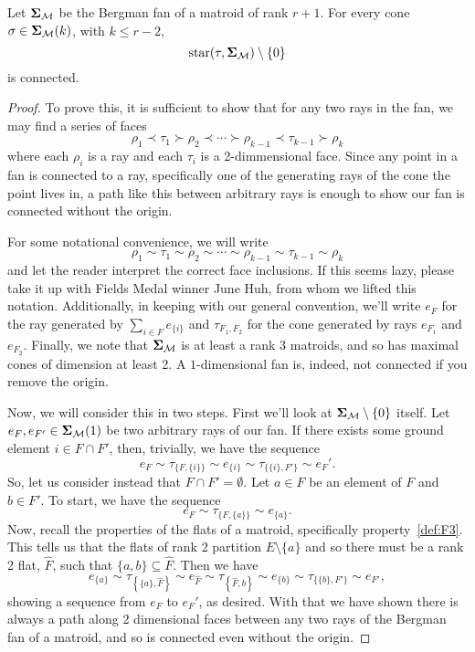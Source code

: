 \documentclass[12pt,oneside]{../../sfsuthesis}
\begin{document}
\begin{lemma}[Connectedness]\th\label{thm:matroidConnected}
    Let \( \bm{\Sigma}_{\mathcal{M}} \) be the Bergman fan of a matroid of rank \( r + 1 \).
    For every cone \( \sigma \in \bm{\Sigma}_{\mathcal{M}}(k) \), with \( k \leq r - 2 \),
    \[
        \operatorname{star}(\tau, \bm{\Sigma}_{\mathcal{M}}) \setminus \{ 0 \}
    \]
    is connected.
\end{lemma}
\begin{proof}
    To prove this, it is sufficient to show that for any two rays in the fan, we may find a series of faces
    \[
        \rho_1 \prec \tau_1 \succ \rho_2 \prec \cdots \succ \rho_{k-1} \prec \tau_{k-1} \succ \rho_k
    \]
    where each \( \rho_i \) is a ray and each \( \tau_i \) is a 2-dimmensional face.
    Since any point in a fan is connected to a ray, specifically one of the generating rays of the cone the point lives in, a path like this between arbitrary rays is enough to show our fan is connected without the origin.

    For some notational convenience, we will write
    \[
        \rho_1 \sim \tau_1 \sim \rho_2 \sim \cdots \sim \rho_{k-1} \sim \tau_{k-1} \sim \rho_k
    \]
    and let the reader interpret the correct face inclusions.
    If this seems lazy, please take it up with Fields Medal winner June Huh, from whom we lifted this notation.
    Additionally, in keeping with our general convention, we'll write \( e_F \) for the ray generated by \( \sum_{i \in F} e_{\{i\}} \) and \( \tau_{F_1, F_2} \) for the cone generated by rays \( e_{F_1} \) and \( e_{F_2} \).
    Finally, we note that \( \bm{\Sigma}_{\mathcal{M}} \) is at least a rank 3 matroids, and so has maximal cones of dimension at least 2.
    A \( 1 \)-dimensional fan is, indeed, not connected if you remove the origin.

    Now, we will consider this in two steps.
    First we'll look at \( \bm{\Sigma}_{\mathcal{M}} \setminus \{ 0 \} \) itself.
    Let \( e_{F}, e_{F'} \in \bm{\Sigma}_{\mathcal{M}}(1) \) be two arbitrary rays of our fan.
    If there exists some ground element \( i \in F \cap F' \), then, trivially, we have the sequence
    \[
        e_F \sim \tau_{\{F, \{i\}\}} \sim e_{\{i\}} \sim \tau_{\{\{i\}, F'\}} \sim e_F'.
    \]
    So, let us consider instead that \( F \cap F' = \emptyset \).
    Let \( a \in F \) be an element of \( F \) and \( b \in F' \).
    To start, we have the sequence
    \[
        e_F \sim \tau_{\{F, \{a\}\}} \sim e_{\{a\}}.
    \]
    Now, recall the properties of the flats of a matroid, specifically property~\ref{def:F3}.
    This tells us that the flats of rank 2 partition \( E \setminus \{a\} \) and so there must be a rank 2 flat, \( \widehat{F} \), such that \( \{ a, b \} \subseteq \widehat{F} \).
    Then we have
    \[
        e_{\{a\}} \sim \tau_{\left\{\{a\}, \widehat{F}\right\}} \sim e_{\widehat{F}} \sim \tau_{\left\{\widehat{F}, b\right\}} \sim e_{\{b\}} \sim \tau_{\{\{b\}, F'\}} \sim e_{F'},
    \]
    showing a sequence from \( e_F \) to \( e_F' \), as desired.
    With that we have shown there is always a path along 2 dimensional faces between any two rays of the Bergman fan of a matroid, and so is connected even without the origin.


\end{proof}
\end{document}
